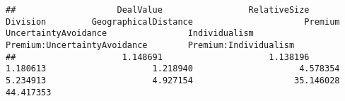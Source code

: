 \documentclass[]{article}
\begin{document}
\begin{verbatim}
##                    DealValue                 RelativeSize                     Division         GeographicalDistance                      Premium         UncertaintyAvoidance                Individualism Premium:UncertaintyAvoidance        Premium:Individualism 
##                     1.148691                     1.138196                     1.180613                     1.218940                     4.578354                     5.234913                     4.927154                    35.146028                    44.417353
\end{verbatim}
\end{document}
